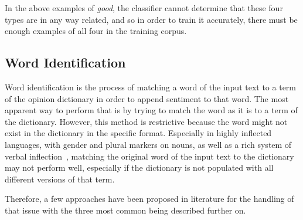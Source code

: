 In the above examples of \emph{good},
the classifier cannot determine that these four types are in any way related, and so in order to train it accurately,
there must be enough examples of all four in the training corpus.

\subsection{Word Identification}
\label{subsec:identification}

Word identification is the process of matching a word of the input text
to a term of the opinion dictionary in order to append sentiment to that word.
The most apparent way to perform that is by trying to match the word as it is
to a term of the dictionary.
However, this method is restrictive because the word might not exist
in the dictionary in the specific format.
Especially in highly inflected languages,
with gender and plural markers on nouns, as
well as a rich system of verbal inflection~\cite{BTT09},
matching the original word of the input text to the dictionary
may not perform well, especially if the dictionary is not populated
with all different versions of that term.

Therefore, a few approaches have been proposed in literature
for the handling of that issue with the three most common being described further on.


